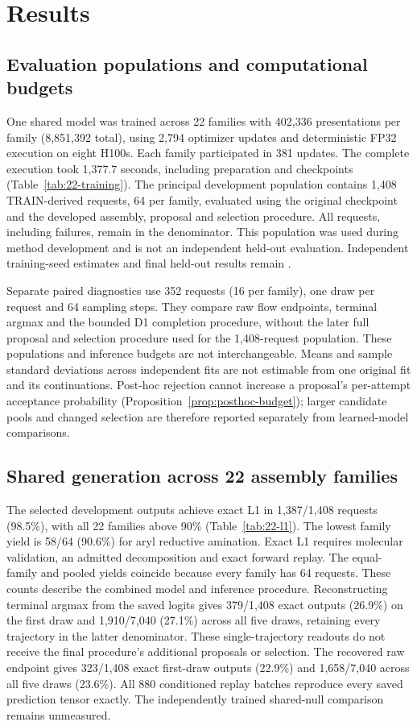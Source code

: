 \section{Results}
\label{sec:results}

\subsection{Evaluation populations and computational budgets}
One shared model was trained across 22 families with 402,336 presentations per family
(8,851,392 total), using 2,794 optimizer updates and deterministic FP32 execution on eight H100s.
Each family participated in 381 updates. The complete execution took 1,377.7 seconds, including
preparation and checkpoints (Table~\ref{tab:22-training}). The principal development population
contains 1,408 TRAIN-derived requests, 64 per family, evaluated using the original checkpoint and
the developed assembly, proposal and selection procedure. All requests, including failures,
remain in the denominator. This population was used during method development and is not an
independent held-out evaluation. Independent training-seed estimates and final held-out results
remain .

Separate paired diagnostics use 352 requests (16 per family), one draw per request and 64
sampling steps. They compare raw flow endpoints, terminal argmax and the bounded D1 completion
procedure, without the later full proposal and selection procedure used for the 1,408-request
population. These populations and inference budgets are not interchangeable. Means and sample
standard deviations across independent fits are not estimable from one original fit and its
continuations. Post-hoc rejection cannot increase a proposal's per-attempt acceptance probability
(Proposition~\ref{prop:posthoc-budget}); larger candidate pools and changed selection are therefore
reported separately from learned-model comparisons.

\subsection{Shared generation across 22 assembly families}
The selected development outputs achieve exact L1 in 1,387/1,408 requests (98.5\%), with all 22
families above 90\% (Table~\ref{tab:22-l1}). The lowest family yield is 58/64 (90.6\%) for aryl
reductive amination. Exact L1 requires molecular validation, an admitted decomposition and exact
forward replay. The equal-family and pooled yields coincide because every family has 64 requests.
These counts describe the combined model and inference procedure. Reconstructing terminal argmax
from the saved logits gives 379/1,408 exact outputs (26.9\%) on the first draw and 1,910/7,040
(27.1\%) across all five draws, retaining every trajectory in the latter denominator. These
single-trajectory readouts do not receive the final procedure's additional proposals or selection.
The recovered raw endpoint gives 323/1,408 exact first-draw outputs (22.9\%) and 1,658/7,040
across all five draws (23.6\%). All 880 conditioned replay batches reproduce every saved prediction
tensor exactly. The independently trained shared-null comparison remains unmeasured.

